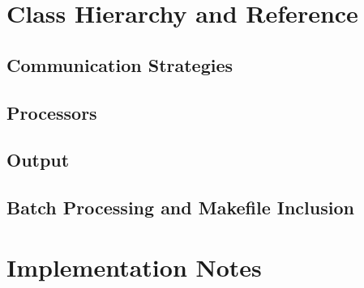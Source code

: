 \section{Class Hierarchy and Reference}

\subsection{Communication Strategies}

\subsection{Processors}

\subsection{Output}

\subsection{Batch Processing and Makefile Inclusion}


\section{Implementation Notes}
